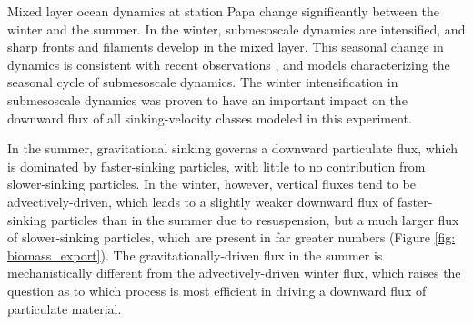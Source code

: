 \documentclass[article,linenumbers]{agujournal2019}
\begin{document}
	Mixed layer ocean dynamics at station Papa change significantly between the winter and the summer. In the winter, submesoscale dynamics are intensified, and sharp fronts and filaments develop in the mixed layer. This seasonal change in dynamics is consistent with recent observations \cite{Thompson_2016, Buckingham_2016}, and models \cite{Brannigan_2015, Callies_2015, Rocha_2016} characterizing the seasonal cycle of submesoscale dynamics. The winter intensification in submesoscale dynamics was proven to have an important impact on the downward flux of all sinking-velocity classes modeled in this experiment.

	In the summer,  gravitational sinking governs a downward particulate flux, which is dominated by faster-sinking particles, with little to no contribution from slower-sinking particles. In the winter, however, vertical fluxes tend to be advectively-driven, which leads to a slightly weaker downward flux of faster-sinking particles than in the summer due to resuspension, but a much larger flux of slower-sinking particles, which are present in far greater numbers (Figure \ref{fig: biomass_export}). The gravitationally-driven flux in the summer is mechanistically different from the advectively-driven winter flux, which raises the question as to which process is most efficient in driving a downward flux of particulate material.
\end{document}
